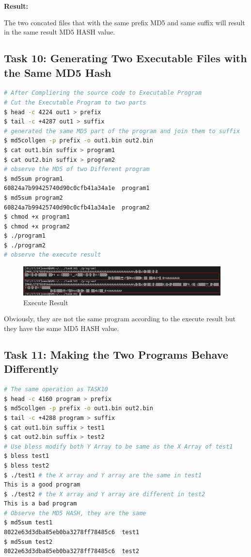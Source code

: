 \documentclass[a4paper]{article}
\begin{document}
\textbf{Result:} 

The two concated files that with the same prefix MD5 and same suffix will result in the same result MD5 HASH value.

\subsection{Task 10: Generating Two Executable Files with the Same MD5 Hash}

\begin{lstlisting}[caption={MD5 Executable Program},label={lst:task3.10},language=BASH,breaklines=true]
# After Compliering the source code to Executable Program
# Cut the Executable Program to two parts
$ head -c 4224 out1 > prefix
$ tail -c +4287 out1 > suffix
# generated the same MD5 part of the program and join them to suffix
$ md5collgen -p prefix -o out1.bin out2.bin
$ cat out1.bin suffix > program1
$ cat out2.bin suffix > program2
# observe the MD5 of two Different program
$ md5sum program1
60824a7b99425740d90c0cfb41a34a1e  program1
$ md5sum program2
60824a7b99425740d90c0cfb41a34a1e  program2
$ chmod +x program1
$ chmod +x program2
$ ./program1
$ ./program2
# observe the execute result
\end{lstlisting} 

\begin{figure}[h]
    \centering
       \includegraphics[width=0.96\textwidth]{figures/task10/executablefiles.png}
    \caption{Execute Result}\label{fig:task10}
\end{figure}

Obviously, they are not the same program according to the execute result but they have the same MD5 HASH value.

\subsection{Task 11: Making the Two Programs Behave Differently}

\begin{lstlisting}[caption={Different Behavior Program},label={lst:task3.11},language=BASH,breaklines=true]
# The same operation as TASK10
$ head -c 4160 program > prefix
$ md5collgen -p prefix -o out1.bin out2.bin
$ tail -c +4288 program > suffix
$ cat out1.bin suffix > test1
$ cat out2.bin suffix > test2
# Use bless modify both Y Array to be same as the X Array of test1
$ bless test1
$ bless test2
$ ./test1 # the X array and Y array are the same in test1
This is a good program
$ ./test2 # the X array and Y array are different in test2
This is a bad program
# Observe the MD5 HASH, they are the same
$ md5sum test1
8022e63d3dba85eb0ba3278ff78485c6  test1
$ md5sum test2
8022e63d3dba85eb0ba3278ff78485c6  test2
\end{lstlisting} 
\end{document}
